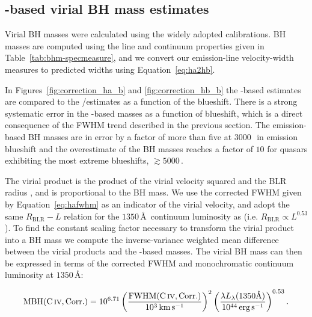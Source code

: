 \subsection{-based virial BH mass estimates}

Virial BH masses were calculated using the widely adopted \citet{vestergaard06} calibrations. 
BH masses are computed using the line and continuum properties given in Table~\ref{tab:bhm-specmeasure}, and we convert our \ha emission-line velocity-width measures to predicted \hb widths using Equation~\ref{eq:ha2hb}.

In Figures~\ref{fig:correction_ha_b} and \ref{fig:correction_hb_b} the -based estimates are compared to the \hans/\hb estimates as a function of the  blueshift. 
There is a strong systematic error in the -based masses as a function of blueshift, which is a direct consequence of the FWHM trend described in the previous section. 
The  emission-based BH masses are in error by a factor of more than five at $3000$\,\kms\, in  emission blueshift and the overestimate of the BH masses reaches a factor of $10$ for quasars exhibiting the most extreme blueshifts, $\gtrsim5000$\,\kms. 

The virial product is the product of the virial velocity squared and the BLR radius \citep[e.g.][]{shen13}, and is proportional to the BH mass. 
We use the corrected  FWHM given by Equation~\ref{eq:hafwhm} as an indicator of the virial velocity, and adopt the same $R_{\text{BLR}}-L$ relation for the $1350$\,\AA\, continuum luminosity as \citet{vestergaard06} (i.e. $R_{\text{BLR}} \propto L^{0.53}$). 
To find the constant scaling factor necessary to transform the virial product into a BH mass we compute the inverse-variance weighted mean difference between the virial products and the \hans-based masses. 
The virial BH mass can then be expressed in terms of the corrected  FWHM and monochromatic continuum luminosity at $1350$\,\AA:

\begingroup\makeatletter{}\check@mathfonts
\begin{eqnarray}
  \label{eq:masscorrection}
  \text{MBH}(\text{C}\,\textsc{iv}, \text{Corr.}) = 10^{6.71}\left( \frac{ \text{FWHM}(\text{C}\,\textsc{iv}, \text{Corr.})}{10^3 \,\text{km}\,\text{s}^{-1}} \right)^2 \left( \frac{\lambda L_{\lambda} (1350 \text{\AA}) }{10^{44} \,\text{erg}\,\text{s}^{-1}}  \right)^{0.53}.
\end{eqnarray}
\endgroup


